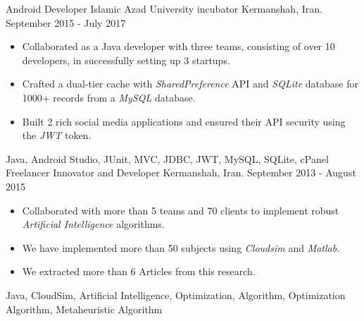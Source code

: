 \begin{experiences}
\experience
{}
{Android Developer}
{Islamic Azad University incubator}
{Kermanshah, Iran. \hspace{70 pt} September 2015 - July 2017}
{}
{
\begin{itemize}
\item Collaborated as a Java developer with three teams, consisting of over 10 developers, in successfully setting up 3 startups.
\item Crafted a dual-tier cache with \emph{SharedPreference} API and \emph{SQLite} database for 1000+ records from a \emph{MySQL} database.
\item Built 2 rich social media applications and ensured their API security using the \emph{JWT} token.
\end{itemize}
}{Java, Android Studio, JUnit, MVC, JDBC, JWT, MySQL, SQLite, cPanel}
\emptySeparator
\experience
{}
{Freelancer Innovator and Developer}
{}
{Kermanshah, Iran. \hspace{140 pt} September 2013 - August 2015}
{}
{
\begin{itemize}
\item Collaborated with more than 5 teams and 70 clients to implement robust \emph{Artificial Intelligence} algorithms.
\item We have implemented more than 50 subjects using \emph{Cloudsim} and \emph{Matlab}.
\item We extracted more than 6 Articles from this research.
\end{itemize}
}{Java, CloudSim, Artificial Intelligence, Optimization, Algorithm, Optimization Algorithm, Metaheuristic Algorithm}
\end{experiences}
